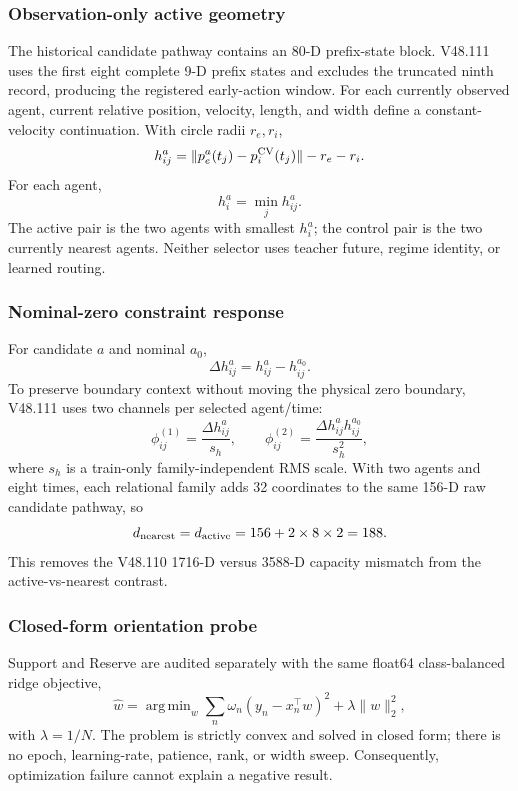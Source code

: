 \documentclass[conference]{IEEEtran}
\DeclareMathOperator*{\argmin}{arg\,min}
\begin{document}
\subsubsection{Observation-only active geometry}
The historical candidate pathway contains an 80-D prefix-state block. V48.111 uses the first eight complete 9-D prefix states and excludes the truncated ninth record, producing the registered early-action window. For each currently observed agent, current relative position, velocity, length, and width define a constant-velocity continuation. With circle radii $r_e,r_i$,
\begin{equation}
 h_{ij}^{a}=\|p_e^{a}(t_j)-p_i^{\rm CV}(t_j)\|-r_e-r_i.
\end{equation}
For each agent,
\begin{equation}
 h_i^{a}=\min_j h_{ij}^{a}.
\end{equation}
The active pair is the two agents with smallest $h_i^a$; the control pair is the two currently nearest agents. Neither selector uses teacher future, regime identity, or learned routing.

\subsubsection{Nominal-zero constraint response}
For candidate $a$ and nominal $a_0$,
\begin{equation}
 \Delta h_{ij}^{a}=h_{ij}^{a}-h_{ij}^{a_0}.
\end{equation}
To preserve boundary context without moving the physical zero boundary, V48.111 uses two channels per selected agent/time:
\begin{equation}
 \phi_{ij}^{(1)}=\frac{\Delta h_{ij}^{a}}{s_h},\qquad
 \phi_{ij}^{(2)}=\frac{\Delta h_{ij}^{a}h_{ij}^{a_0}}{s_h^2},
\end{equation}
where $s_h$ is a train-only family-independent RMS scale. With two agents and eight times, each relational family adds 32 coordinates to the same 156-D raw candidate pathway, so
\begin{equation}
 d_{\rm nearest}=d_{\rm active}=156+2\times8\times2=188.
\end{equation}
This removes the V48.110 1716-D versus 3588-D capacity mismatch from the active-vs-nearest contrast.

\subsubsection{Closed-form orientation probe}
Support and Reserve are audited separately with the same float64 class-balanced ridge objective,
\begin{equation}
 \hat w=\argmin_w \sum_n \omega_n(y_n-x_n^\top w)^2+\lambda\|w\|_2^2,
\end{equation}
with $\lambda=1/N$. The problem is strictly convex and solved in closed form; there is no epoch, learning-rate, patience, rank, or width sweep. Consequently, optimization failure cannot explain a negative result.
\end{document}
